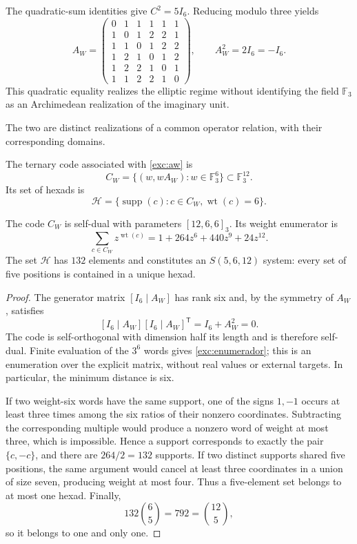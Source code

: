 The quadratic-sum identities give $C^2=5I_6$. Reducing modulo
three yields
\begin{equation}
 A_W=
 \begin{pmatrix}
 0&1&1&1&1&1\\
 1&0&1&2&2&1\\
 1&1&0&1&2&2\\
 1&2&1&0&1&2\\
 1&2&2&1&0&1\\
 1&1&2&2&1&0
 \end{pmatrix},
 \qquad A_W^2=2I_6=-I_6.
 \label{exc:aw}
\end{equation}
This quadratic equality realizes the elliptic regime without identifying
the field $\mathbb F_3$ as an Archimedean realization of the imaginary unit.

The two are distinct realizations of a common operator relation, with their
corresponding domains.

\begin{definition}
\label{exc:codigo}
The ternary code associated with \eqref{exc:aw} is
\[
 C_W=\{(w,wA_W):w\in\mathbb F_3^6\}
       \subset\mathbb F_3^{12}.
\]
Its set of hexads is
\[
 \mathcal H=
 \{\operatorname{supp}(c):c\in C_W,
                           \operatorname{wt}(c)=6\}.
\]
\end{definition}

\begin{proposition}
\label{exc:codigo-witt}
The code $C_W$ is self-dual with parameters $[12,6,6]_3$. Its weight
enumerator is
\begin{equation}
 \sum_{c\in C_W}z^{\operatorname{wt}(c)}
   =1+264z^6+440z^9+24z^{12}.
 \label{exc:enumerador}
\end{equation}
The set $\mathcal H$ has $132$ elements and constitutes an
$S(5,6,12)$ system: every set of five positions is contained in a
unique hexad.
\end{proposition}

\begin{proof}
The generator matrix $[I_6\mid A_W]$ has rank six and, by the symmetry
of $A_W$, satisfies
\[
 [I_6\mid A_W][I_6\mid A_W]^{\mathsf T}
   =I_6+A_W^2=0.
\]
The code is self-orthogonal with dimension half its length and is therefore
self-dual. Finite evaluation of the $3^6$ words gives
\eqref{exc:enumerador}; this is an enumeration over the explicit matrix,
without real values or external targets. In particular, the minimum
distance is six.

If two weight-six words have the same support, one of the signs $1,-1$
occurs at least three times among the six ratios of their nonzero
coordinates. Subtracting the corresponding multiple would produce
a nonzero word of weight at most three, which is impossible. Hence a support
corresponds to exactly the pair $\{c,-c\}$, and there are $264/2=132$
supports. If two distinct supports shared five positions,
the same argument would cancel at least three coordinates in a union
of size seven, producing weight at most four. Thus a
five-element set belongs to at most one hexad. Finally,
\[
 132\binom65=792=\binom{12}5,
\]
so it belongs to one and only one.
\end{proof}

